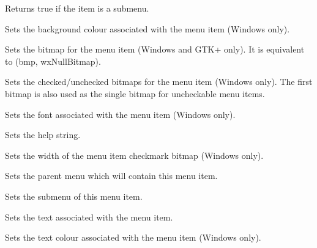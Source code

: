 Returns true if the item is a submenu.


\label{wxmenuitemsetbackgroundcolour}


Sets the background colour associated with the menu item (Windows only).


\label{wxmenuitemsetbitmap}


Sets the bitmap for the menu item (Windows and GTK+ only). It is
equivalent to (bmp, wxNullBitmap).


\label{wxmenuitemsetbitmaps}


Sets the checked/unchecked bitmaps for the menu item (Windows only). The first bitmap
is also used as the single bitmap for uncheckable menu items.


\label{wxmenuitemsetfont}


Sets the font associated with the menu item (Windows only).


\label{wxmenuitemsethelp}


Sets the help string.


\label{wxmenuitemsetmarginwidth}


Sets the width of the menu item checkmark bitmap (Windows only).


\label{wxmenuitemsetmenu}


Sets the parent menu which will contain this menu item.


\label{wxmenuitemsetsubmenu}


Sets the submenu of this menu item.


\label{wxmenuitemsettext}


Sets the text associated with the menu item.


\label{wxmenuitemsettextcolour}


Sets the text colour associated with the menu item (Windows only).

